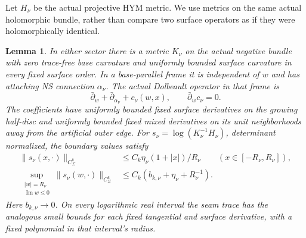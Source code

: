 \documentclass[11pt]{amsart}
\newtheorem{lemma}[theorem]{Lemma}
\theoremstyle{definition}
\theoremstyle{remark}
\theoremstyle{plain}
\begin{document}
Let $H_\nu$ be the actual projective HYM metric. We use metrics on
the same actual holomorphic bundle, rather than compare two surface
operators as if they were holomorphically identical.

\begin{lemma}\label{lem:converse-reference-metric}
In either sector there is a metric $K_\nu$ on the actual negative
bundle with zero trace-free base curvature and uniformly bounded
surface curvature in every fixed surface order. In a base-parallel
frame it is independent of $w$ and has attaching NS connection
$\alpha_\nu$. The actual Dolbeault operator in that frame is
\begin{equation}\label{eq:converse-base-flat-frame}
 \bar\partial_w+\bar\partial_{\alpha_\nu}+c_\nu(w,x),
                         \qquad \bar\partial_wc_\nu=0.
\end{equation}
The coefficients have uniformly bounded fixed surface derivatives
on the growing half-disc and uniformly bounded fixed mixed derivatives
on its unit neighborhoods away from the artificial outer edge.
For $s_\nu=\log(K_\nu^{-1}H_\nu)$, determinant normalized, the
boundary values satisfy
\begin{equation}\label{eq:converse-metric-boundary}
\begin{split}
 \|s_\nu(x,\cdot)\|_{C^k_\Sigma}
        &\leq C_k\eta_\nu(1+|x|)/R_\nu
                           \qquad(x\in[-R_\nu,R_\nu]),\\
 \sup_{\substack{|w|=R_\nu\\\operatorname{Im}w\leq0}}
       \|s_\nu(w,\cdot)\|_{C^k_\Sigma}
        &\leq C_k(b_{k,\nu}+\eta_\nu+R_\nu^{-1}).
\end{split}
\end{equation}
Here $b_{k,\nu}\to0$. On every logarithmic real interval the seam trace has the analogous
small bounds for each fixed tangential and surface derivative,
with a fixed polynomial in that interval's radius.
\end{lemma}
\end{document}
